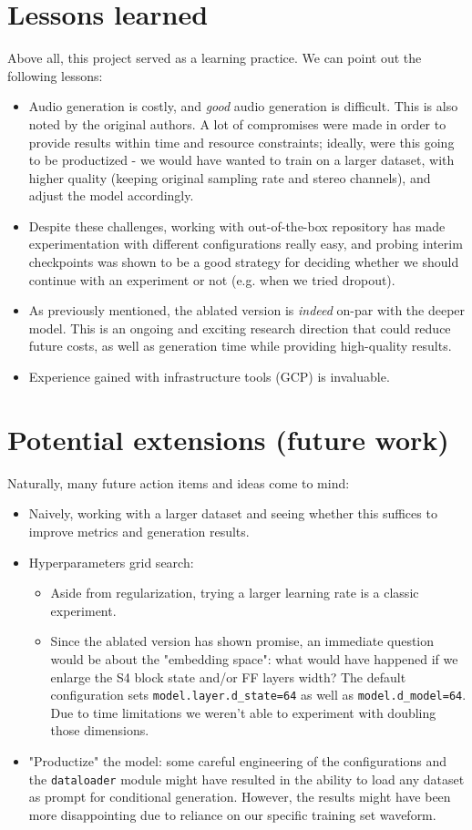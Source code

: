 \documentclass[12pt]{article}
\begin{document}
\section{Lessons learned}
Above all, this project served as a learning practice. We can point out the following lessons:
\begin{itemize}
    \item Audio generation is costly, and \textit{good} audio generation is difficult. This is also noted by the original authors. A lot of compromises were made in order to provide results within time and resource constraints; ideally, were this going to be productized - we would have wanted to train on a larger dataset, with higher quality (keeping original sampling rate and stereo channels), and adjust the model accordingly.
    \item Despite these challenges, working with out-of-the-box repository has made experimentation with different configurations really easy, and probing interim checkpoints was shown to be a good strategy for deciding whether we should continue with an experiment or not (e.g. when we tried dropout).
    \item As previously mentioned, the ablated version is \textit{indeed} on-par with the deeper model. This is an ongoing and exciting research direction \cite{gromov2024unreasonableineffectivenessdeeperlayers} that could reduce future costs, as well as generation time while providing high-quality results.
    \item Experience gained with infrastructure tools (GCP) is invaluable.
\end{itemize}

\section{Potential extensions (future work)}
Naturally, many future action items and ideas come to mind:
\begin{itemize}
    \item Naively, working with a larger dataset and seeing whether this suffices to improve metrics and generation results.
    \item Hyperparameters grid search: 
    \begin{itemize}
     \item Aside from regularization, trying a larger learning rate is a classic experiment.
     \item Since the ablated version has shown promise, an immediate question would be about the "embedding space": what would have happened if we enlarge the S4 block state and/or FF layers width? The default configuration sets \texttt{model.layer.d\_state=64} as well as \texttt{model.d\_model=64}. Due to time limitations we weren't able to experiment with doubling those dimensions.
    \end{itemize}
    \item "Productize" the model: some careful engineering of the configurations and the \texttt{dataloader} module might have resulted in the ability to load any dataset as prompt for conditional generation. However, the results might have been more disappointing due to reliance on our specific training set waveform.
\end{itemize}
\end{document}
